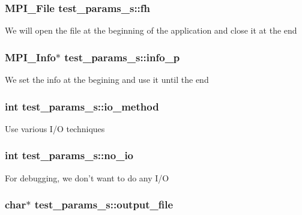 \subsubsection{\setlength{\rightskip}{0pt plus 5cm}MPI\_\-File \bf{test\_\-params\_\-s::fh}}\label{structtest__params__s_5d52ced986aae804318847129589a3be}


We will open the file at the beginning of the application and close it at the end 
\subsubsection{\setlength{\rightskip}{0pt plus 5cm}MPI\_\-Info$\ast$ \bf{test\_\-params\_\-s::info\_\-p}}\label{structtest__params__s_0f1c0b804dea64227dea025f0f90c85b}


We set the info at the begining and use it until the end 
\subsubsection{\setlength{\rightskip}{0pt plus 5cm}int \bf{test\_\-params\_\-s::io\_\-method}}\label{structtest__params__s_658fc5405e6dcfac79bfbe0234907e98}


Use various I/O techniques 
\subsubsection{\setlength{\rightskip}{0pt plus 5cm}int \bf{test\_\-params\_\-s::no\_\-io}}\label{structtest__params__s_699bd29a69af8dbeb891c9fab745e5d3}


For debugging, we don't want to do any I/O 
\subsubsection{\setlength{\rightskip}{0pt plus 5cm}char$\ast$ \bf{test\_\-params\_\-s::output\_\-file}}\label{structtest__params__s_170b355fac6303993da89a0d1f984cdc}


